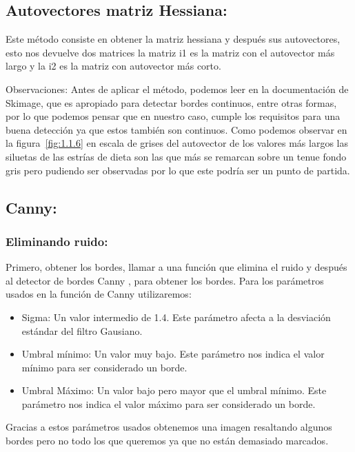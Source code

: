 \subsection{Autovectores matriz Hessiana:}
Este método consiste en obtener la matriz hessiana \cite{wiki:Hessiana} y después sus autovectores, esto nos devuelve dos matrices la matriz i1 es la matriz con el autovector más largo y la i2 es la matriz con autovector más corto.



Observaciones: 
Antes de aplicar el método, podemos leer en la documentación de Skimage, que es apropiado para detectar bordes continuos, entre otras formas, por lo que podemos pensar que en nuestro caso, cumple los requisitos para una buena detección ya que estos también son continuos. 
Como podemos observar en la figura~\ref{fig:1.1.6} en escala de grises del autovector de los valores más largos las siluetas de las estrías de dieta son las que más se remarcan sobre un tenue fondo gris pero pudiendo ser observadas por lo que este podría ser un punto de partida.



\subsection{Canny:}

\subsubsection{Eliminando ruido:}
Primero, obtener los bordes, llamar a una función que elimina el ruido y después al detector de bordes Canny \cite{wiki:Canny}, para obtener los bordes.
Para los parámetros usados en la función de Canny utilizaremos:
\begin{itemize}
	\item Sigma: Un valor intermedio de 1.4.
	Este parámetro afecta a la desviación estándar del filtro Gausiano.
	\item Umbral mínimo: Un valor muy bajo.
	Este parámetro nos indica el valor mínimo para ser considerado un borde.
	\item Umbral Máximo: Un valor bajo pero mayor que el umbral mínimo.
	Este parámetro nos indica el valor máximo para ser considerado un borde.
\end{itemize}
Gracias a estos parámetros usados obtenemos una imagen resaltando algunos bordes pero no todo los que queremos ya que no están demasiado marcados.




